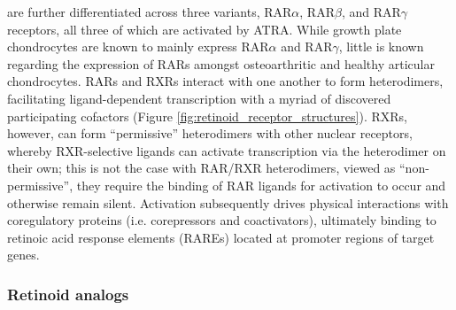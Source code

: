 \begin{refsection}
are further differentiated across three variants, RAR${\alpha}$, RAR${\beta}$,
and RAR${\gamma}$ receptors, all three of which are activated by
ATRA.\cite{Chambon1996} While growth plate chondrocytes are known to mainly
express RAR${\alpha}$ and RAR${\gamma}$,\cite{Koyama1999} little is known
regarding the expression of RARs amongst osteoarthritic and healthy articular
chondrocytes. RARs and RXRs interact with one another to form heterodimers,
facilitating ligand-dependent transcription with a myriad of discovered
participating cofactors (Figure \ref{fig:retinoid_receptor_structures}). RXRs, however,
can form ``permissive'' heterodimers with other nuclear receptors, whereby
RXR-selective ligands can activate transcription via the heterodimer on their
own; this is not the case with RAR/RXR heterodimers, viewed as
``non-permissive'', they require the binding of RAR ligands for activation to
occur and otherwise remain silent.\cite{Altucci2007} Activation subsequently
drives physical interactions with coregulatory proteins (i.e. corepressors and
coactivators), ultimately binding to retinoic acid response elements (RAREs)
located at promoter regions of target genes.\cite{Germain2002,DeLera2007}

\subsubsection{Retinoid analogs}


\end{refsection}
